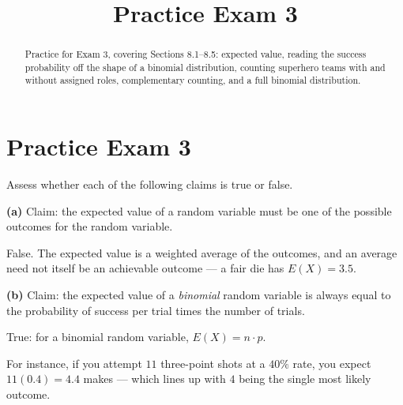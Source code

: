 \documentclass[12pt]{ximera}
\title{Practice Exam 3}
\begin{document}
\begin{abstract}
Practice for Exam 3, covering Sections 8.1--8.5: expected value, reading the success probability
off the shape of a binomial distribution, counting superhero teams with and without
assigned roles, complementary counting, and a full binomial distribution.
\end{abstract}
\maketitle

\section*{Practice Exam 3}

\begin{problem}
Assess whether each of the following claims is true or false.

\begin{prompt}
\textbf{(a)} Claim: the expected value of a random variable must be one of the
possible outcomes for the random variable.

\begin{multipleChoice}
\end{multipleChoice}

\begin{feedback}
False. The expected value is a weighted average of the outcomes, and an average need
not itself be an achievable outcome --- a fair die has $E(X)=3.5$.
\end{feedback}
\end{prompt}

\begin{prompt}
\textbf{(b)} Claim: the expected value of a \emph{binomial} random variable is always
equal to the probability of success per trial times the number of trials.

\begin{multipleChoice}
\end{multipleChoice}

\begin{feedback}
True: for a binomial random variable, $E(X)=n\cdot p$.

For instance, if you attempt $11$ three-point shots at a $40\%$ rate, you expect
$11(0.4)=4.4$ makes --- which lines up with $4$ being the single most likely
outcome.
\end{feedback}
\end{prompt}
\end{problem}
\end{document}

